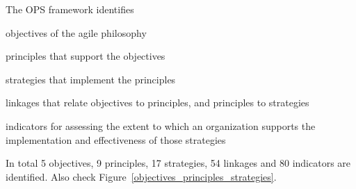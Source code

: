 
The \ac{OPS} framework identifies 
\begin{inparaenum} [a\upshape)]
\item objectives of the agile philosophy
\item principles that support the objectives
\item strategies that implement the principles
\item linkages that relate objectives to
principles, and principles to strategies
\item indicators for assessing the extent to which an organization supports the implementation and effectiveness of those strategies
\end{inparaenum}


In total 5 objectives, 9 principles, 17 strategies, 54 linkages and 80 indicators are identified. Also check Figure~\ref{objectives_principles_strategies}.

